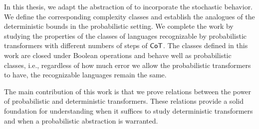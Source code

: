 \smallskip

In this thesis, we adapt the abstraction of \citet{toyota} to incorporate the stochastic behavior.
We define the corresponding complexity classes and establish the analogues of the deterministic bounds in the probabilistic setting.
We complete the work by studying the properties of the classes of languages recognizable by probabilistic transformers with different numbers of steps of $\mathsf{CoT}$.
The classes defined in this work are closed under Boolean operations and behave well as probabilistic classes, i.e., regardless of how much error we allow the probabilistic transformers to have, the recognizable languages remain the same.

The main contribution of this work is that we prove relations between the power of probabilistic and deterministic transformers.
These relations provide a solid foundation for understanding when it suffices to study deterministic transformers and when a probabilistic abstraction is warranted.






